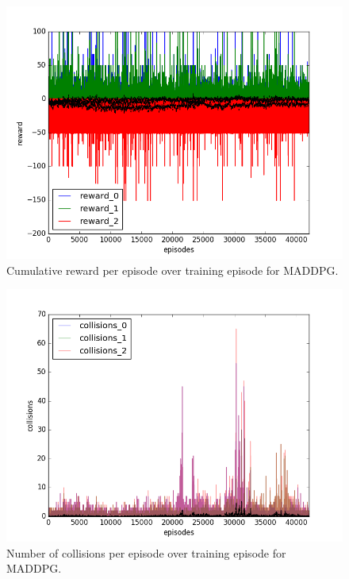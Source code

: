 \begin{figure}[h]
  \centering
  \includegraphics[trim=10 10 10 10,clip,width=\figscale\linewidth]
  {../results/maddpg_1vs2/reward.png}
  \caption{Cumulative reward per episode over training episode for MADDPG.}
  \label{fig:maddpg-1vs2}
\end{figure}
\FloatBarrier


\begin{figure}[h]
  \centering
  \includegraphics[trim=10 10 10 10,clip,width=\figscale\linewidth]
  {../results/maddpg_1vs2/collisions.png}
  \caption{Number of collisions per episode over training episode for MADDPG.}
  \label{fig:maddpg-1vs2}
\end{figure}
\FloatBarrier


